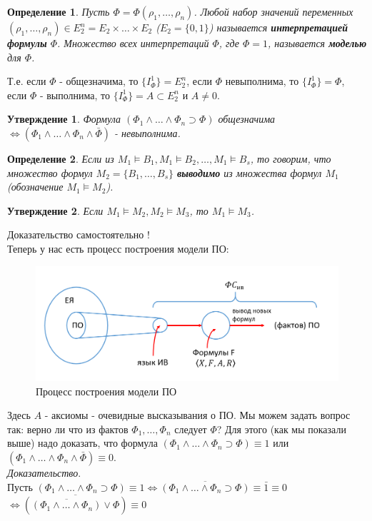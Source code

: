 \documentclass{article}
\newtheorem{definition}{Определение}
\newtheorem{proposition}{Утверждение}
\numberwithin{example}{section}
\numberwithin{question}{section}
\numberwithin{Remark}{section}
\numberwithin{theorem}{section}
\numberwithin{definition}{section}
\numberwithin{proposition}{section}
\begin{document}
\begin{definition}
Пусть $\Phi=\Phi(\rho_1,\ldots,\rho_n)$. Любой набор значений переменных $(\rho_1,\ldots,\rho_n)\in E^n_2=E_2\times\ldots\times E_2$ ($E_2=\{0,1\}$) называется \textbf{интерпретацией формулы} $\Phi$. Множество всех интерпретаций $\Phi$, где $\Phi=1$, называется \textbf{моделью} для $\Phi$.
\end{definition}
 Т.е. если $\Phi$ - общезначима, то $\{I^1_{\Phi} \}=E^n_2$, если $\Phi$ невыполнима, то $\{I^1_{\Phi}\}=\Phi$, если $\Phi$ - выполнима, то $\{I^1_{\Phi} \}=A\subset E^n_2 $ и $A\ne0$.
\begin{proposition}
	Формула $(\Phi_1\wedge\ldots\wedge\Phi_n\supset\Phi)$ общезначима $\Leftrightarrow(\Phi_1\wedge\ldots\wedge\Phi_n\wedge\bar{\Phi})$ - невыполнима. 
\end{proposition}
\begin{definition}
Если из $M_1\models B_1,M_1\models B_2,\ldots,M_1\models B_s$, то говорим, что множество формул $M_2=\{B_1,\ldots,B_s \}$ \textbf{выводимо} из множества формул $M_1$(обозначение $M_1\models M_2$).
\end{definition}
\begin{proposition}
	Если $M_1\models M_2,M_2\models M_3$, то $M_1\models M_3$.
\end{proposition}
Доказательство самостоятельно !\\
Теперь у нас есть процесс построения модели ПО:
\begin{figure}[!htbp]
	\centering
	\includegraphics[width=0.7\linewidth]{3-7}
	\caption{Процесс построения модели ПО}
	\label{fig:3-7}
\end{figure}
Здесь $A$ - аксиомы - очевидные высказывания о ПО. Мы можем задать вопрос так: верно ли что из фактов $\Phi_1,\ldots,\Phi_n$ следует $\Phi$? Для этого (как мы показали выше) надо доказать, что формула $(\Phi_1\wedge\ldots\wedge \Phi_n\supset \Phi)\equiv 1$ или $(\Phi_1\wedge\ldots\wedge\Phi_n\wedge\bar{\Phi})\equiv 0$.\\
\emph{Доказательство}.\\
 Пусть $(\Phi_1\wedge\ldots\wedge\Phi_n\supset\Phi)\equiv 1$$\Leftrightarrow \overline{(\Phi_1\wedge\ldots\wedge\Phi_n\supset\Phi)}\equiv \bar{1}\equiv 0$$\Leftrightarrow \overline{(\overline{(\Phi_1\wedge\ldots\wedge\Phi_n)}\vee\Phi)}\equiv 0$\\
\end{document}
